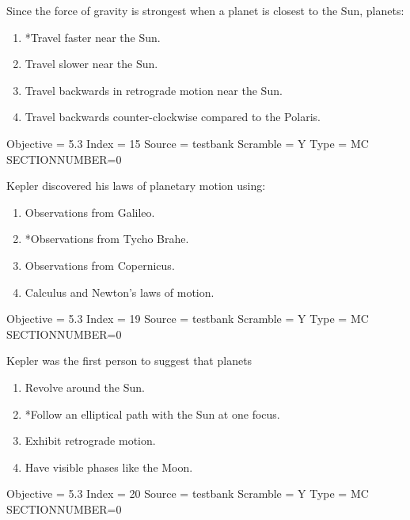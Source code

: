 \documentclass[11pt]{article}
\begin{document}
\begin{enumerate}
\begin{minipage}{\textwidth}
\begin{minipage}{\textwidth}
\item Since the force of gravity is strongest when a planet is closest to the Sun, planets:
\begin{enumerate} 
\setlength{\itemsep}{1pt} 
\setlength{\parskip}{0pt} 
\setlength{\parsep}{0pt}
\setlength{\multicolsep}{1pt} 
\item *Travel faster near the Sun.
\item Travel slower near the Sun.
\item Travel backwards in retrograde motion near the Sun.
\item Travel backwards counter-clockwise compared to the Polaris.
\end{enumerate} 
Objective = 5.3
Index = 15
Source = testbank
Scramble = Y
Type = MC
SECTIONNUMBER=0
\end{minipage}
\end{minipage}
\vskip 0.20in

\begin{minipage}{\textwidth}
\begin{minipage}{\textwidth}
\item Kepler discovered his laws of planetary motion using:
\begin{multicols}{2}
\begin{enumerate} 
\setlength{\itemsep}{1pt} 
\setlength{\parskip}{0pt} 
\setlength{\parsep}{0pt}
\setlength{\multicolsep}{1pt} 
\item Observations from Galileo.
\item *Observations from Tycho Brahe.
\item Observations from Copernicus.
\item Calculus and Newton's laws of motion.
\end{enumerate} 
\vfill 
\end{multicols}

Objective = 5.3
Index = 19
Source = testbank
Scramble = Y
Type = MC
SECTIONNUMBER=0
\end{minipage}
\end{minipage}
\vskip 0.20in

\begin{minipage}{\textwidth}
\begin{minipage}{\textwidth}
\item Kepler was the first person to suggest that planets
\begin{enumerate} 
\setlength{\itemsep}{1pt} 
\setlength{\parskip}{0pt} 
\setlength{\parsep}{0pt}
\setlength{\multicolsep}{1pt} 
\item Revolve around the Sun.
\item *Follow an elliptical path with the Sun at one focus.
\item Exhibit retrograde motion.
\item Have visible phases like the Moon.
\end{enumerate} 
Objective = 5.3
Index = 20
Source = testbank
Scramble = Y
Type = MC
SECTIONNUMBER=0
\end{minipage}
\end{minipage}
\vskip 0.20in


\end{enumerate}
\end{document}
